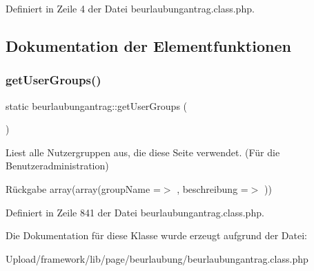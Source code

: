 Definiert in Zeile 4 der Datei beurlaubungantrag.\+class.\+php.



\subsection{Dokumentation der Elementfunktionen}
\mbox{\label{classbeurlaubungantrag_ac839672f786681521a02fafd6077351f}} 
\subsubsection{\texorpdfstring{get\+User\+Groups()}{getUserGroups()}}
{\footnotesize\ttfamily static beurlaubungantrag\+::get\+User\+Groups (\begin{DoxyParamCaption}{ }\end{DoxyParamCaption})\hspace{0.3cm}{\ttfamily [static]}}

Liest alle Nutzergruppen aus, die diese Seite verwendet. (Für die Benutzeradministration) \begin{DoxyReturn}{Rückgabe}
array(array(\textquotesingle{}group\+Name\textquotesingle{} =$>$ \textquotesingle{}\textquotesingle{}, \textquotesingle{}beschreibung\textquotesingle{} =$>$ \textquotesingle{}\textquotesingle{})) 
\end{DoxyReturn}


Definiert in Zeile 841 der Datei beurlaubungantrag.\+class.\+php.



Die Dokumentation für diese Klasse wurde erzeugt aufgrund der Datei\+:\begin{DoxyCompactItemize}
\item 
Upload/framework/lib/page/beurlaubung/beurlaubungantrag.\+class.\+php\end{DoxyCompactItemize}
